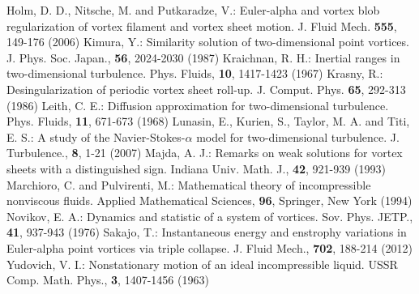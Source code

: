 \documentclass{article}
\theoremstyle{definition}
\begin{document}
\begin{thebibliography}{99}
Holm, D. D., Nitsche, M. and Putkaradze, V.: Euler-alpha and vortex blob regularization of vortex filament and vortex sheet motion. J. Fluid Mech. \textbf{555}, 149-176 (2006)
Kimura, Y.: Similarity solution of two-dimensional point vortices. J. Phys. Soc. Japan., \textbf{56}, 2024-2030 (1987) 
Kraichnan, R. H.: Inertial ranges in two-dimensional turbulence. Phys. Fluids, \textbf{10}, 1417-1423 (1967) 
Krasny, R.: Desingularization of periodic vortex sheet roll-up. J. Comput. Phys. \textbf{65}, 292-313 (1986)
Leith, C. E.: Diffusion approximation for two-dimensional turbulence. Phys. Fluids, \textbf{11}, 671-673 (1968) 
Lunasin, E., Kurien, S., Taylor, M. A. and Titi, E. S.: A study of the Navier-Stokes-$\alpha$ model for two-dimensional turbulence. J. Turbulence., \textbf{8}, 1-21 (2007) 
Majda, A. J.: Remarks on weak solutions for vortex sheets with a distinguished sign. Indiana Univ. Math. J., \textbf{42}, 921-939 (1993) 
Marchioro, C. and Pulvirenti, M.: Mathematical theory of incompressible nonviscous fluids. Applied Mathematical Sciences, \textbf{96}, Springer, New York (1994) 
Novikov, E. A.: Dynamics and statistic of a system of vortices. Sov. Phys. JETP., \textbf{41}, 937-943 (1976)
Sakajo, T.: Instantaneous energy and enstrophy variations in Euler-alpha point vortices via triple collapse. J. Fluid Mech., \textbf{702}, 188-214 (2012) 
Yudovich, V. I.: Nonstationary motion of an ideal incompressible liquid. USSR Comp. Math. Phys., \textbf{3}, 1407-1456 (1963)

\end{thebibliography}
\end{document}
